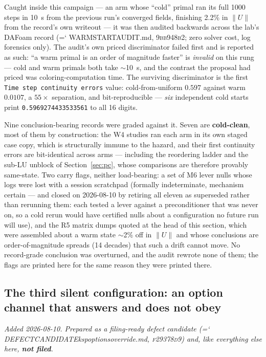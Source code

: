 \documentclass[11pt,a4paper]{article}
\newcommand{\artifact}[1]{{\small\ttfamily\hyphenchar\font=`\-\relax
  \def\_{\textunderscore\allowbreak}#1}}
\newcommand{\commit}[1]{\textsc{\small #1}}
\begin{document}
Caught inside this campaign --- an arm whose ``cold'' primal ran its full 1000 steps in 10~s
from the previous run's converged fields, finishing 2.2\% in \(\lVert U\rVert\) from the
record's own writeout --- it was then audited backwards across the lab's DAFoam record
(\artifact{WARMSTART\_AUDIT.md}, \commit{9bb948b2}; zero solver cost, log forensics only). The
audit's own priced discriminator failed first and is reported as such: ``a warm primal is an
order of magnitude faster'' is \emph{invalid} on this rung --- cold and warm primals both take
\(\sim\)10~s, and the contrast the proposal had priced was coloring-computation time. The
surviving discriminator is the first \texttt{Time step continuity errors} value: cold-from-uniform
\(0.597\) against warm \(0.0107\), a \(55\times\) separation, and bit-reproducible ---
\emph{six} independent cold starts print \texttt{0.5969274433533561} to all 16 digits.

Nine conclusion-bearing records were graded against it. Seven are \textbf{cold-clean}, most of
them by construction: the W4 studies ran each arm in its own staged case copy, which is
structurally immune to the hazard, and their first continuity errors are bit-identical across
arms --- including the reordering ladder and the sub-LU unblock of Section~\ref{sec:pc}, whose
comparisons are therefore provably same-state. Two carry flags, neither load-bearing: a set of
M6 lever nulls whose logs were lost with a session scratchpad (formally indeterminate, mechanism
certain --- and closed on 2026-08-10 by retiring all eleven as superseded rather than rerunning
them: each tested a lever against a preconditioner that was never on, so a cold rerun would have
certified nulls about a configuration no future run will use),
and the R5 matrix dumps quoted at the head of this section, which were assembled about a warm state
\(\sim\)2\% off in \(\lVert U\rVert\) and whose conclusions are order-of-magnitude spreads
(14 decades) that such a drift cannot move. No record-grade conclusion was overturned, and the
audit rewrote none of them; the flags are printed here for the same reason they were printed
there.

\subsection{The third silent configuration: an option channel that answers and does not obey}
\label{sec:kspoverride}

\emph{Added 2026-08-10. Prepared as a filing-ready defect candidate
(\artifact{DEFECT\_CANDIDATE\_ksp\_options\_override.md}, \commit{f29378d9}) and, like
everything else here, \textbf{not filed}.}
\end{document}
